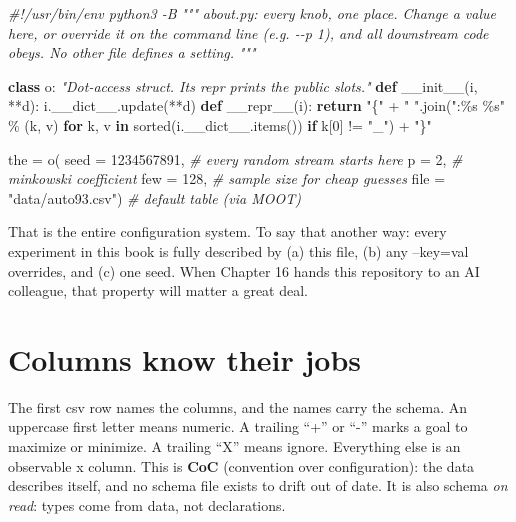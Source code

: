 \documentclass[
  justified]{tufte-book}
\newenvironment{Shaded}{}{}
\newcommand{\BuiltInTok}[1]{\textcolor[rgb]{0.00,0.50,0.00}{#1}}
\newcommand{\CommentTok}[1]{\textcolor[rgb]{0.38,0.63,0.69}{\textit{#1}}}
\newcommand{\ControlFlowTok}[1]{\textcolor[rgb]{0.00,0.44,0.13}{\textbf{#1}}}
\newcommand{\DecValTok}[1]{\textcolor[rgb]{0.25,0.63,0.44}{#1}}
\newcommand{\FunctionTok}[1]{\textcolor[rgb]{0.02,0.16,0.49}{#1}}
\newcommand{\KeywordTok}[1]{\textcolor[rgb]{0.00,0.44,0.13}{\textbf{#1}}}
\newcommand{\NormalTok}[1]{#1}
\newcommand{\OperatorTok}[1]{\textcolor[rgb]{0.40,0.40,0.40}{#1}}
\newcommand{\SpecialCharTok}[1]{\textcolor[rgb]{0.25,0.44,0.63}{#1}}
\newcommand{\StringTok}[1]{\textcolor[rgb]{0.25,0.44,0.63}{#1}}
\begin{document}
\begin{Shaded}
\begin{Highlighting}[]
\CommentTok{\#!/usr/bin/env python3 {-}B}
\CommentTok{"""}
\CommentTok{about.py: every knob, one place. Change a value here, or}
\CommentTok{override it on the command line (e.g. {-}{-}p 1), and all}
\CommentTok{downstream code obeys. No other file defines a setting.}
\CommentTok{"""}

\KeywordTok{class}\NormalTok{ o:}
  \CommentTok{"Dot{-}access struct. Its repr prints the public slots."}
  \KeywordTok{def} \FunctionTok{\_\_init\_\_}\NormalTok{(i, }\OperatorTok{**}\NormalTok{d): i.\_\_dict\_\_.update(}\OperatorTok{**}\NormalTok{d)}
  \KeywordTok{def} \FunctionTok{\_\_repr\_\_}\NormalTok{(i):}
    \ControlFlowTok{return} \StringTok{"\{"} \OperatorTok{+} \StringTok{" "}\NormalTok{.join(}\StringTok{":}\SpecialCharTok{\%s}\StringTok{ }\SpecialCharTok{\%s}\StringTok{"} \OperatorTok{\%}\NormalTok{ (k, v)}
      \ControlFlowTok{for}\NormalTok{ k, v }\KeywordTok{in} \BuiltInTok{sorted}\NormalTok{(i.\_\_dict\_\_.items())}
      \ControlFlowTok{if}\NormalTok{ k[}\DecValTok{0}\NormalTok{] }\OperatorTok{!=} \StringTok{"\_"}\NormalTok{) }\OperatorTok{+} \StringTok{"\}"}

\NormalTok{the }\OperatorTok{=}\NormalTok{ o(}
\NormalTok{  seed }\OperatorTok{=} \DecValTok{1234567891}\NormalTok{,        }\CommentTok{\# every random stream starts here}
\NormalTok{  p    }\OperatorTok{=} \DecValTok{2}\NormalTok{,                 }\CommentTok{\# minkowski coefficient}
\NormalTok{  few  }\OperatorTok{=} \DecValTok{128}\NormalTok{,               }\CommentTok{\# sample size for cheap guesses}
  \BuiltInTok{file} \OperatorTok{=} \StringTok{"data/auto93.csv"}\NormalTok{) }\CommentTok{\# default table (via MOOT)}
\end{Highlighting}
\end{Shaded}

That is the entire configuration system. To say that another way: every
experiment in this book is fully described by (a) this file, (b) any
--key=val overrides, and (c) one seed. When Chapter 16 hands this
repository to an AI colleague, that property will matter a great deal.

\section{Columns know their jobs}\label{columns-know-their-jobs}

The first csv row names the columns, and the names carry the schema. An
uppercase first letter means numeric. A trailing ``+'' or ``-'' marks a
goal to maximize or minimize. A trailing ``X'' means ignore. Everything
else is an observable x column. This is \textbf{CoC} (convention over
configuration): the data describes itself, and no schema file exists to
drift out of date. It is also schema \emph{on read}: types come from
data, not declarations.
\end{document}
